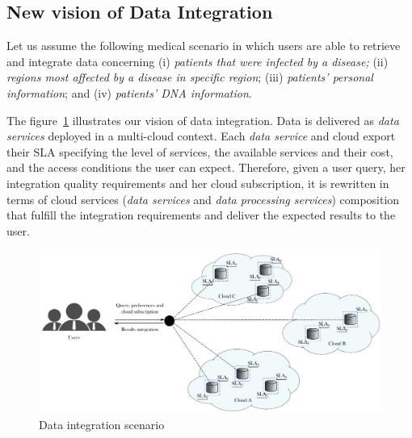 
\subsection{New vision of Data Integration}
Let us assume the following medical scenario in which users are able to retrieve and integrate data concerning (i) \textit{patients that were infected by a disease;}
(ii) \textit{regions most affected by a disease in specific region}; (iii)
\textit{patients' personal information}; and (iv) \textit{patients' DNA
information}.

The figure~\ref{fig:scenario} illustrates our vision of data integration. Data is delivered as \textit{data services} deployed in a multi-cloud context. Each \textit{data service} and cloud export their SLA specifying the level of services, the available services and their cost, and the access conditions the user can expect. Therefore, given a user query, her integration quality requirements and her cloud subscription, it is rewritten in terms of cloud services (\textit{data services} and \textit{data processing services}) composition that fulfill the integration requirements and deliver the expected results to the user.

\begin{figure}[h!]
\center
\includegraphics[scale=0.57]{scenario.pdf}
\caption{Data integration scenario}\label{fig:scenario}
\end{figure}

